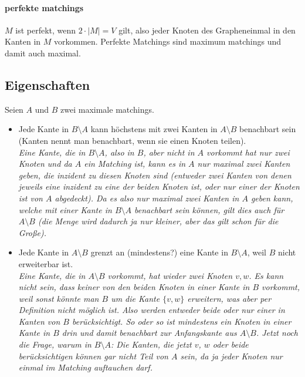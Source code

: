 \documentclass[paper=a4,10pt]{scrartcl}
\begin{document}
\paragraph{perfekte matchings}
$M$ ist perfekt, wenn $2 \cdot |M| = V$ gilt, also jeder Knoten des Grapheneinmal in den Kanten in $M$ vorkommen. Perfekte Matchings sind maximum matchings und damit auch maximal. 

\subsection{Eigenschaften}
Seien $A$ und $B$ zwei maximale matchings. 

\begin{itemize}
\item Jede Kante in $B \setminus A$ kann höchstens mit zwei Kanten in $A \setminus B$ benachbart sein (Kanten nennt man benachbart, wenn sie einen Knoten teilen). \\
\textit{Eine Kante, die in $B \setminus A$, also in $B$, aber nicht in $A$ vorkommt hat nur zwei Knoten und da $A$ ein Matching ist, kann es in $A$ nur maximal zwei Kanten geben, die inzident zu diesen Knoten sind (entweder zwei Kanten von denen jeweils eine inzident zu eine der beiden Knoten ist, oder nur einer der Knoten ist von $A$ abgedeckt). Da es also nur maximal zwei Kanten in $A$ geben kann, welche mit einer Kante in $B \setminus A$ benachbart sein können, gilt dies auch für $A \setminus B$ (die Menge wird dadurch ja nur kleiner, aber das gilt schon für die Große).}

\item Jede Kante in $A \setminus B$ grenzt an (mindestens?) eine Kante in $B \setminus A$, weil $B$ nicht erweiterbar ist.\\
\textit{Eine Kante, die in $A \setminus B$ vorkommt, hat wieder zwei Knoten $v, w$. Es kann nicht sein, dass keiner von den beiden Knoten in einer Kante in $B$ vorkommt, weil sonst könnte man $B$ um die Kante $\{v, w\}$ erweitern, was aber per Definition nicht möglich ist. Also werden entweder beide oder nur einer in Kanten von $B$ berücksichtigt. So oder so ist mindestens ein Knoten in einer Kante in $B$ drin und damit benachbart zur Anfangskante aus $A \setminus B$. Jetzt noch die Frage, warum in $B\setminus A$: Die Kanten, die jetzt $v$, $w$ oder beide berücksichtigen können gar nicht Teil von $A$ sein, da ja jeder Knoten nur einmal im Matching auftauchen darf.}
\end{itemize}
\end{document}
